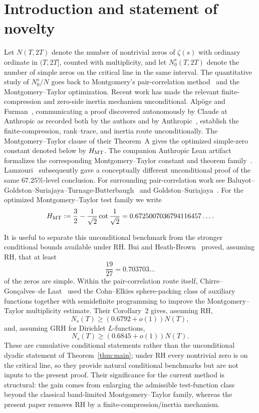 \documentclass[11pt]{article}
\begin{document}
\section{Introduction and statement of novelty}
\label{sec:introduction}

Let \(N(T,2T)\) denote the number of nontrivial zeros of \(\zeta(s)\) with
ordinary ordinate in \((T,2T]\), counted with multiplicity, and let
\(N_0^s(T,2T)\) denote the number of simple zeros on the critical line in the
same interval. The quantitative study of \(N_0^s/N\) goes back to
Montgomery's pair-correlation method~\cite{Mon73,Mon75} and the Montgomery--Taylor optimization.
Recent work has made the relevant finite-compression and zero-side inertia
mechanism unconditional.  Alpöge and Furman~\cite{AlpogeFurman26}, communicating
a proof discovered autonomously by Claude at Anthropic as recorded both by the
authors and by Anthropic~\cite{Anthropic26}, establish the finite-compression,
rank--trace, and inertia route unconditionally.  The Montgomery--Taylor clause of their Theorem~A gives the optimized
simple-zero constant denoted below by \(H_{\rm MT}\).  The companion Anthropic Lean artifact formalizes the corresponding
Montgomery--Taylor constant and theorem family~\cite{AnthropicFormal26}.  Lamzouri~\cite{Lamzouri26} subsequently gave a conceptually
different unconditional proof of the same \(67.25\%\)-level conclusion.
For surrounding pair-correlation work see
Baluyot--Goldston--Suriajaya--Turnage-Butterbaugh~\cite{BGSTB24,BGSTB25} and
Goldston--Suriajaya~\cite{GS25,GS26}.
For the optimized Montgomery--Taylor test family we write
\begin{equation}\label{eq:HMT}
 H_{\rm MT}:=\frac32-\frac1{\sqrt2}\cot\frac1{\sqrt2}
 =0.6725007036794116457\ldots .
\end{equation}

It is useful to separate this unconditional benchmark from the stronger
conditional bounds available under RH.  Bui and Heath-Brown~\cite{BuiHB13}
proved, assuming RH, that at least
\[
 \frac{19}{27}=0.703703\ldots
\]
of the zeros are simple.  Within the pair-correlation route itself,
Chirre--Gon\c{c}alves--de Laat~\cite{CGdL20} used the Cohn--Elkies
sphere-packing class of auxiliary functions together with semidefinite
programming to improve the Montgomery--Taylor multiplicity estimate.  Their
Corollary~2 gives, assuming RH,
\[
 N_s(T)\ge(0.6792+o(1))N(T),
\]
and, assuming GRH for Dirichlet $L$-functions,
\[
 N_s(T)\ge(0.6845+o(1))N(T).
\]
These are cumulative conditional statements rather than the unconditional
dyadic statement of Theorem~\ref{thm:main}; under RH every nontrivial zero is
on the critical line, so they provide natural conditional benchmarks but are
not inputs to the present proof.  Their significance for the current method
is structural: the gain comes from enlarging the admissible test-function
class beyond the classical band-limited Montgomery--Taylor family, whereas
the present paper removes RH by a finite-compression/inertia mechanism.
\end{document}
